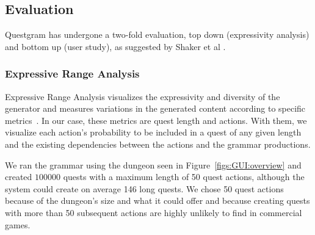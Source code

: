 \subsection{Evaluation}

Questgram has undergone a two-fold evaluation, %
top down (expressivity analysis) and bottom up (user study), as suggested by Shaker et al . %



\subsubsection{Expressive Range Analysis} \label{sec:quantExp}

Expressive Range Analysis visualizes the expressivity and diversity of the generator and measures variations in the generated content according to specific metrics~. In our case, these metrics are quest length and actions. With them, we visualize each action's probability to be included in a quest of any given length and the existing dependencies between the actions and the grammar productions. 

We ran the grammar using the dungeon seen in Figure~\ref{figs:GUI:overview} and created $100000$ quests with a maximum length of 50 quest actions, although the system could create on average 146 long quests. We chose 50 quest actions because of the dungeon's size and what it could offer and because creating quests with more than 50 subsequent %
actions are highly unlikely to find in commercial games. 

